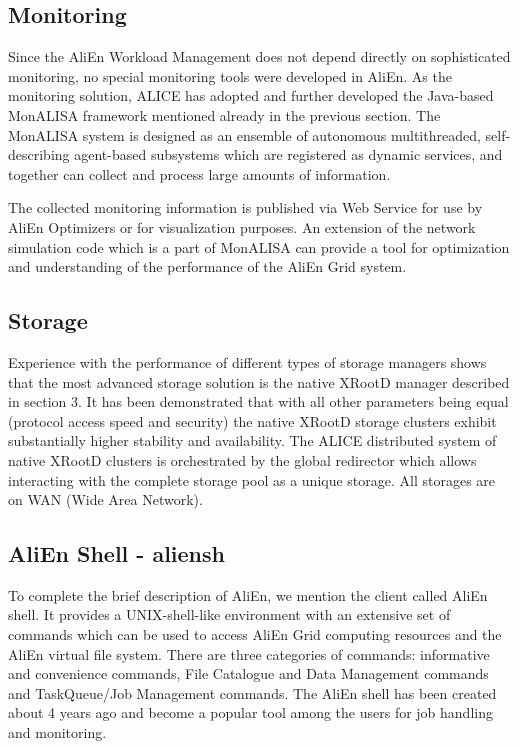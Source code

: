 \subsection{Monitoring}
%
Since the AliEn Workload Management does not
depend directly on sophisticated monitoring, no special monitoring
tools were developed in AliEn. As the monitoring solution, ALICE has
adopted and further developed the Java-based MonALISA framework
mentioned already in the previous section. The MonALISA system is
designed as an ensemble of autonomous multithreaded, self-describing
agent-based subsystems which are registered as dynamic services, and
together can collect and process large amounts of information.

The collected monitoring information is published via Web Service
for use by AliEn Optimizers or for visualization purposes. An
extension of the network simulation code which is a part of MonALISA
can provide a tool for optimization and understanding of the
performance of the AliEn Grid system.

\subsection{Storage}
%
Experience with the performance of different types of storage
managers shows that the most advanced storage solution is the native
XRootD manager described in section 3. It has been demonstrated
that with all other parameters being equal (protocol access speed
and security) the native XRootD storage clusters exhibit
substantially higher stability and availability. The ALICE
distributed system of native XRootD clusters is orchestrated by the
global redirector which allows interacting with the complete storage
pool as a unique storage.  All storages are on WAN (Wide Area
Network).

\subsection{AliEn Shell - aliensh}
%
To complete the brief description of AliEn, we mention the client
called AliEn shell. It provides a UNIX-shell-like environment with
an extensive set of commands which can be used to access AliEn Grid
computing resources and the AliEn virtual file system.  There are
three categories of commands: informative and convenience commands,
File Catalogue and Data Management commands and TaskQueue/Job
Management commands. The AliEn shell has been created about 4 years
ago and become a popular tool among the users for job handling and
monitoring.

